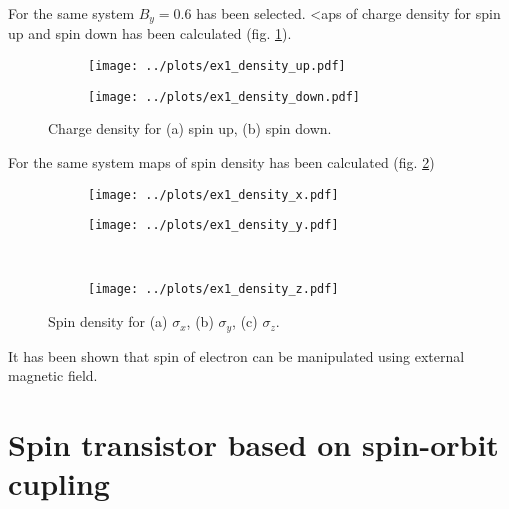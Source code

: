 \documentclass[a4paper, 12pt]{article}
\begin{document}
For the same system $B_y = 0.6$ has been selected.
<aps of charge density for spin up and spin down has been calculated (fig. \ref{fig:ex1_density_maps}).

\begin{figure}[h]
    \begin{center}
        \begin{subfigure}{0.49\textwidth}
            \texttt{[image: ../plots/ex1\_density\_up.pdf]}
            \caption{}
        \end{subfigure}
        \begin{subfigure}{0.49\textwidth}
            \texttt{[image: ../plots/ex1\_density\_down.pdf]}
            \caption{}
        \end{subfigure}
    \end{center}
    \caption{Charge density for (a) spin up, (b) spin down.}
    \label{fig:ex1_density_maps}
\end{figure}

For the same system maps of spin density has been calculated (fig. \ref{fig:ex1_spin_maps})

\begin{figure}[H]
    \begin{center}
        \begin{subfigure}{0.49\textwidth}
            \texttt{[image: ../plots/ex1\_density\_x.pdf]}
            \caption{}
        \end{subfigure}
        \begin{subfigure}{0.49\textwidth}
            \texttt{[image: ../plots/ex1\_density\_y.pdf]}
            \caption{}
        \end{subfigure}
        \\
        \begin{subfigure}{0.49\textwidth}
            \texttt{[image: ../plots/ex1\_density\_z.pdf]}
            \caption{}
        \end{subfigure}
    \end{center}
    \caption{Spin density for (a) $\sigma_x$, (b) $\sigma_y$, (c) $\sigma_z$.}
    \label{fig:ex1_spin_maps}
\end{figure}

It has been shown that spin of electron can be manipulated using external magnetic field.

\section*{Spin transistor based on spin-orbit cupling}
\end{document}
